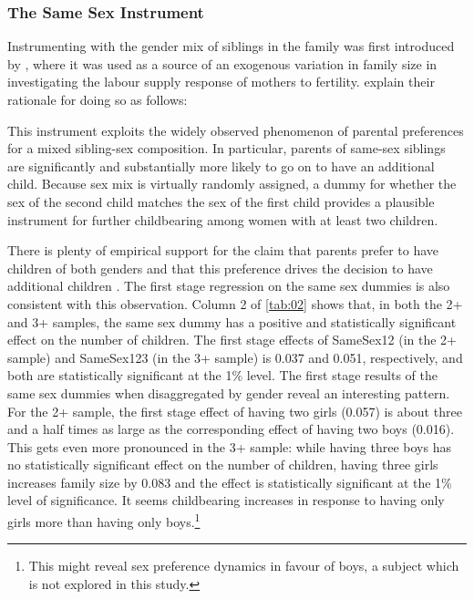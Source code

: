 \subsubsection{The Same Sex Instrument}
\label{section:samesx}

Instrumenting with the gender mix of siblings in the family was first introduced by \textcite{angrist_children_1998}, where it was used as a source of an exogenous variation in family size in investigating the labour supply response of mothers to fertility. \textcite{angrist_children_1998} explain their rationale for doing so as follows:

\begin{displayquote}[p.~451]
This instrument exploits the widely observed phenomenon of parental preferences for a mixed sibling-sex composition. In particular, parents of same-sex siblings are significantly and substantially more likely to go on to have an additional child. Because sex mix is virtually randomly assigned, a dummy for whether the sex of the second child matches the sex of the first child provides a plausible instrument for further childbearing among women with at least two children. 
\end{displayquote}

There is plenty of empirical support for the claim that parents prefer to have children of both genders and that this preference drives the decision to have additional children \parencite[e.g.,][]{norling_measuring_2018,bisbee_local_2015}. The first stage regression on the same sex dummies is also consistent with this observation. Column 2 of \autoref{tab:02} shows that, in both the 2+ and 3+ samples, the same sex dummy has a positive and statistically significant effect on the number of children.  The first stage effects of SameSex12 (in the 2+ sample) and SameSex123 (in the 3+ sample) is 0.037 and 0.051, respectively, and both are statistically significant at the 1\% level. The first stage results of the same sex dummies when disaggregated by gender reveal an interesting pattern. For the 2+ sample, the first stage effect of having two girls (0.057) is about three and a half times as large as the corresponding effect of having two boys (0.016). This gets even more pronounced in the 3+ sample: while having three boys has no statistically significant effect on the number of children, having three girls increases family size by 0.083 and the effect is statistically significant at the 1\% level of significance. It seems childbearing increases in response to having only girls more than having only boys.\footnote{ This might reveal sex preference dynamics in favour of boys, a subject which is not explored in this study. } 

